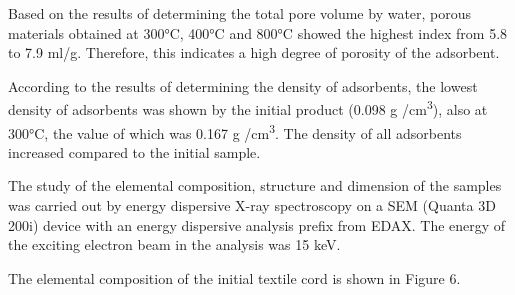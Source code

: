 \begin{multicols}{2}
Based on the results of determining the total pore volume by water,
porous materials obtained at 300°C, 400°C and 800°C showed the highest
index from 5.8 to 7.9 ml/g. Therefore, this indicates a high degree of
porosity of the adsorbent.

According to the results of determining the density of adsorbents, the
lowest density of adsorbents was shown by the initial product (0.098 g
/cm\textsuperscript{3}), also at 300°C, the value of which was 0.167 g
/cm\textsuperscript{3}. The density of all adsorbents increased compared
to the initial sample.

The study of the elemental composition, structure and dimension of the
samples was carried out by energy dispersive X-ray spectroscopy on a SEM
(Quanta 3D 200i) device with an energy dispersive analysis prefix from
EDAX. The energy of the exciting electron beam in the analysis was 15
keV.

The elemental composition of the initial textile cord is shown in Figure
6.
\end{multicols}

